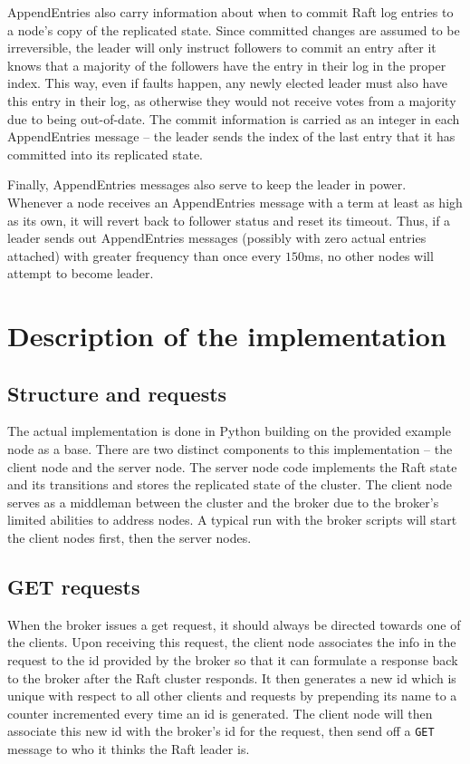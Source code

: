 \documentclass[psamsfonts]{amsart}
\begin{document}
AppendEntries also carry information about when to commit Raft log entries to a node's copy of the replicated state. Since committed changes are assumed to be irreversible, the leader will only instruct followers to commit an entry after it knows that a majority of the followers have the entry in their log in the proper index. This way, even if faults happen, any newly elected leader must also have this entry in their log, as otherwise they would not receive votes from a majority due to being out-of-date. The commit information is carried as an integer in each AppendEntries message -- the leader sends the index of the last entry that it has committed into its replicated state.

Finally, AppendEntries messages also serve to keep the leader in power. Whenever a node receives an AppendEntries message with a term at least as high as its own, it will revert back to follower status and reset its timeout. Thus, if a leader sends out AppendEntries messages (possibly with zero actual entries attached) with greater frequency than once every $150$ms, no other nodes will attempt to become leader.
\section{Description of the implementation}
\subsection{Structure and requests}
The actual implementation is done in Python building on the provided example node as a base. There are two distinct components to this implementation -- the client node and the server node. The server node code implements the Raft state and its transitions and stores the replicated state of the cluster. The client node serves as a middleman between the cluster and the broker due to the broker's limited abilities to address nodes. A typical run with the broker scripts will start the client nodes first, then the server nodes.

\subsection{GET requests}
When the broker issues a get request, it should always be directed towards one of the clients. Upon receiving this request, the client node associates the info in the request to the id provided by the broker so that it can formulate a response back to the broker after the Raft cluster responds. It then generates a new id which is unique with respect to all other clients and requests by prepending its name to a counter incremented every time an id is generated. The client node will then associate this new id with the broker's id for the request, then send off a \verb|GET| message to who it thinks the Raft leader is.
\end{document}
